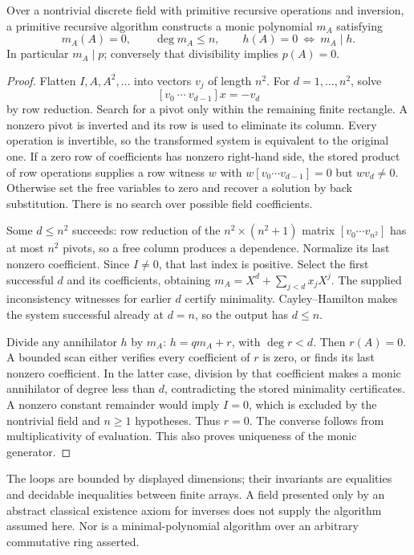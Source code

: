 \begin{proposition}
Over a nontrivial discrete field with primitive recursive operations and
inversion, a primitive recursive algorithm constructs a monic polynomial
$m_A$ satisfying
\[
 m_A(A)=0,\qquad \deg m_A\leq n,\qquad
 h(A)=0\ \Longleftrightarrow\ m_A\mid h.
\]
In particular $m_A\mid p$; conversely that divisibility implies $p(A)=0$.
\end{proposition}
\begin{proof}
Flatten $I,A,A^2,\ldots$ into vectors $v_j$ of length $n^2$.
For $d=1,\ldots,n^2$, solve
\[
 [v_0\ \cdots\ v_{d-1}]x=-v_d
\]
by row reduction. Search for a pivot only within the remaining finite
rectangle. A nonzero pivot is inverted and its row is used to eliminate
its column. Every operation is invertible, so the transformed system is
equivalent to the original one. If a zero row of coefficients has nonzero
right-hand side, the stored product of row operations supplies a row
witness $w$ with $w[v_0\cdots v_{d-1}]=0$ but $wv_d\ne0$. Otherwise set
the free variables to zero and recover a solution by back substitution.
There is no search over possible field coefficients.

Some $d\leq n^2$ succeeds: row reduction of the $n^2\times(n^2+1)$
matrix $[v_0\cdots v_{n^2}]$ has at most $n^2$ pivots, so a free column
produces a dependence. Normalize its last nonzero coefficient. Since
$I\ne0$, that last index is positive. Select the first successful $d$
and its coefficients, obtaining $m_A=X^d+\sum_{j<d}x_jX^j$.
The supplied inconsistency witnesses for earlier $d$ certify minimality.
Cayley--Hamilton makes the system successful already at $d=n$, so the
output has $d\leq n$.

Divide any annihilator $h$ by $m_A$: $h=qm_A+r$, with $\deg r<d$.
Then $r(A)=0$. A bounded scan either verifies every coefficient of $r$
is zero, or finds its last nonzero coefficient. In the latter case,
division by that coefficient makes a monic annihilator of degree less
than $d$, contradicting the stored minimality certificates. A nonzero constant
remainder would imply $I=0$, which is excluded by the nontrivial field
and $n\ge1$ hypotheses. Thus $r=0$.
The converse follows from multiplicativity of evaluation. This also
proves uniqueness of the monic generator.
\end{proof}

The loops are bounded by displayed dimensions; their invariants are
equalities and decidable inequalities between finite arrays. A field
presented only by an abstract classical existence axiom for inverses
does not supply the algorithm assumed here. Nor is a minimal-polynomial
algorithm over an arbitrary commutative ring asserted.

